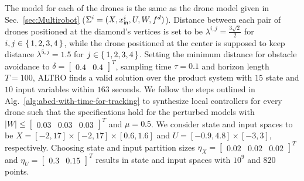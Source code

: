 The model for each of the drones is the same as the drone model given in Sec.~\ref{sec:Multirobot} ($\Sigma^i=(X,x_{\mathsf{in}}^i,U,W,f^d)$). Distance between each pair of drones positioned at the diamond's vertices is set to be $\lambda^{i,j}=\frac{3\sqrt{2}}{2}$ for $i,j\in\set{1,2,3,4}$, while the drone positioned at the center is supposed to keep distance $\lambda^{5,j}=1.5$ for $j\in\set{1,2,3,4}$. Setting the minimum distance for obstacle avoidance to $\delta=\begin{bmatrix}0.4&0.4\end{bmatrix}^T$, sampling time $\tau=0.1$ and horizon length $T=100$, ALTRO finds a valid solution over the product system with $15$ state and $10$ input variables within $163$ seconds.
We follow the steps outlined in Alg.~\ref{alg:abcd-with-time-for-tracking} to synthesize local controllers for every drone such that the specifications hold for the perturbed models with $|W|\leq \begin{bmatrix}0.03&0.03&0.03\end{bmatrix}^T$ and $\mu=0.5$. %
We consider state and input spaces to be $X=[-2,17]\times[-2,17]\times[0.6,1.6]$ and
$U=[-0.9,4.8]\times[-3,3]$, respectively. Choosing state and input partition sizes $\eta_{X}=\begin{bmatrix}0.02&0.02&0.02\end{bmatrix}^T$ and
$\eta_{U}=\begin{bmatrix}0.3&0.15\end{bmatrix}^T$ results in state and input spaces with $10^9$ and $820$ points. 
